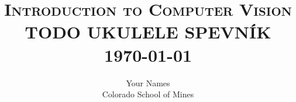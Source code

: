 \documentclass{article}
\begin{document}
%
	
\selectfont

\title{
	\normalsize \textsc{Introduction to Computer Vision} \\
	\vspace{20\baselineskip}
	\LARGE \textbf{\uppercase{TODO Ukulele Spevník}} \\
	\normalsize \today \vspace*{15\baselineskip}
}

\date{}

\author{
	Your Names \\ 
	Colorado School of Mines \\ }

\maketitle
\newpage

\tableofcontents


\end{document}
